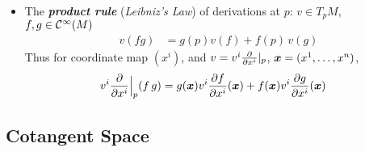 \documentclass[11pt]{article}
\begin{document}
\begin{itemize}
\item The \emph{\textbf{product rule}} (\emph{Leibniz's Law}) of derivations at $p$: $v \in T_pM$, $f, g \in {\mathcal C}^{\infty}(M)$
\begin{align*}
v(fg) &= g(p) v(f) + f(p)\, v(g)
\end{align*}
Thus for coordinate map $(x^i)$, and $v = v^i \frac{\partial }{ \partial x^i}|_{p}$, $\boldsymbol{x} = (x^1, \ldots, x^{n})$,
\begin{align*}
v^i \frac{\partial }{ \partial x^i}\Bigr|_{p}(f\,g) &= g(\boldsymbol{x}) v^i \frac{\partial f}{ \partial x^i}(\boldsymbol{x}) + f(\boldsymbol{x})v^i \frac{\partial g}{ \partial x^i}(\boldsymbol{x})
\end{align*}
\end{itemize}

\subsection{Cotangent Space}
\end{document}
